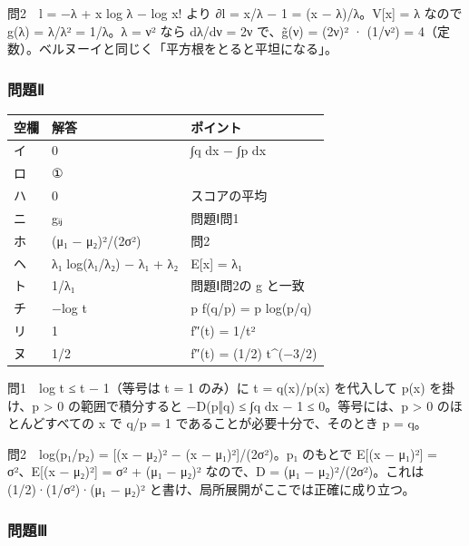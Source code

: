 \documentclass[
  10pt,
  a4paper,
]{article}
\begin{document}
問2　l = −λ + x log λ − log x! より ∂l = x/λ − 1 = (x − λ)/λ。V{[}x{]} =
λ なので g(λ) = λ/λ² = 1/λ。λ = ν² なら dλ/dν = 2ν
で、{\fallbackfont g̃}(ν) = (2ν)² · (1/ν²) =
4（定数）。ベルヌーイと同じく「平方根をとると平坦になる」。

\hypertarget{ux554fux984cux2171}{%
\subsubsection{問題Ⅱ}\label{ux554fux984cux2171}}

\begin{longtable}[]{@{}lll@{}}
\toprule\noalign{}
空欄 & 解答 & ポイント \\
\midrule\noalign{}
\endhead
\bottomrule\noalign{}
\endlastfoot
イ & 0 & ∫q dx − ∫p dx \\
ロ & ① & \\
ハ & 0 & スコアの平均 \\
ニ & g{\fallbackfont ᵢⱼ} & 問題Ⅰ問1 \\
ホ & (μ{\fallbackfont ₁} − μ{\fallbackfont ₂})²/(2σ²) & 問2 \\
ヘ & λ{\fallbackfont ₁} log(λ{\fallbackfont ₁}/λ{\fallbackfont ₂}) −
λ{\fallbackfont ₁} + λ{\fallbackfont ₂} & E{[}x{]} =
λ{\fallbackfont ₁} \\
ト & 1/λ{\fallbackfont ₁} & 問題Ⅰ問2の g と一致 \\
チ & −log t & p f(q/p) = p log(p/q) \\
リ & 1 & f″(t) = 1/t² \\
ヌ & 1/2 & f″(t) = (1/2) t\^{}(−3/2) \\
\end{longtable}

問1　log t ≤ t − 1（等号は t = 1 のみ）に t = q(x)/p(x) を代入して p(x)
を掛け、p \textgreater{} 0 の範囲で積分すると −D(p‖q) ≤ ∫q dx − 1 ≤
0。等号には、p \textgreater{} 0 のほとんどすべての x で q/p = 1
であることが必要十分で、そのとき p = q。

問2　log(p{\fallbackfont ₁}/p{\fallbackfont ₂}) = {[}(x −
μ{\fallbackfont ₂})² − (x −
μ{\fallbackfont ₁})²{]}/(2σ²)。p{\fallbackfont ₁} のもとで E{[}(x −
μ{\fallbackfont ₁})²{]} = σ²、E{[}(x − μ{\fallbackfont ₂})²{]} = σ² +
(μ{\fallbackfont ₁} − μ{\fallbackfont ₂})² なので、D =
(μ{\fallbackfont ₁} − μ{\fallbackfont ₂})²/(2σ²)。これは
(1/2)·(1/σ²)·(μ{\fallbackfont ₁} − μ{\fallbackfont ₂})²
と書け、局所展開がここでは正確に成り立つ。

\hypertarget{ux554fux984cux2172}{%
\subsubsection{問題Ⅲ}\label{ux554fux984cux2172}}
\end{document}
